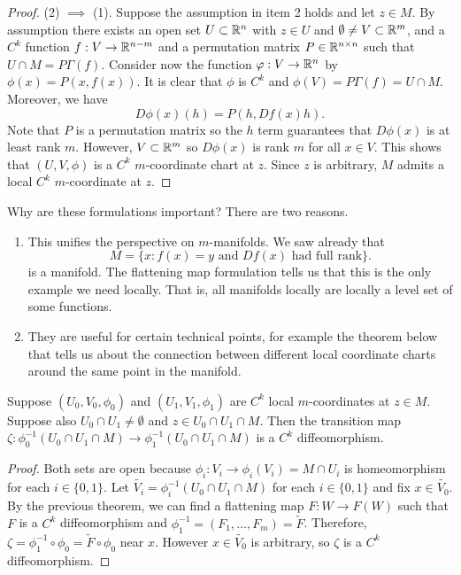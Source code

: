 \documentclass[a4paper]{article}
\begin{document}
\begin{proof}
  (2) $\implies$ (1). Suppose the assumption in item 2 holds
  and let $z \in M$. By assumption there exists an
  open set $U \subset \mathbb{R}^n$ with $z \in U$ and $\emptyset
    \neq V \subset \mathbb{R}^m$, and a $C^k$ function $f : V \to \mathbb{R}^{n - m}$
  and a permutation matrix $P \in \mathbb{R}^{n \times n}$ such that
  $U \cap M = P \Gamma (f)$. Consider now the function
  $\varphi: V \to \mathbb{R}^n$ by $\phi(x) = P (x, f(x))$. It is
  clear that $\phi$ is $C^k$ and $\phi(V) = P \Gamma(f)
    = U \cap M$. Moreover, we have
  \[
    D \phi(x) (h) = P (h, Df(x) h).
  \]
  Note that $P$ is a permutation matrix so the $h$ term guarantees that $D
  \phi(x)$ is at least rank $m$. However, $V \subset \mathbb{R}^m$ so $D \phi(x)$
  is rank $m$ for all $x \in V$. This shows that $(U, V, \phi)$ is a $C^k$
  $m$-coordinate chart at $z$. Since $z$ is arbitrary, $M$ admits a local
  $C^k$ $m$-coordinate at $z$.
\end{proof}

Why are these formulations important? There are two reasons.
\begin{enumerate}
  \item This unifies the perspective on $m$-manifolds. We saw already that
        \[
          M = \{x : \text{$f(x) = y$ and $Df(x)$ had full rank}\}.
        \]
        is a manifold. The flattening map formulation tells us that this
        is the only example we need locally. That is, all manifolds
        locally are locally a level set of some functions.

  \item They are useful for certain technical points, for example the
        theorem below that tells us about the connection between different
        local coordinate charts around the same point in the manifold.
\end{enumerate}

\begin{thm}
  Suppose $(U_0, V_0, \phi_0)$ and $(U_1, V_1, \phi_1)$ are $C^k$ local
  $m$-coordinates at $z \in M$. Suppose also $U_0 \cap U_1 \neq \emptyset$
  and $z \in U_0 \cap U_1 \cap M$. Then the transition map $\zeta :
    \phi_0^{-1}(U_0 \cap U_1 \cap M) \to \phi_1^{-1} (U_0 \cap U_1 \cap M)$
  is a $C^k$ diffeomorphism.
\end{thm}

\begin{proof}
  Both sets are open because $\phi_i : V_i \to \phi_i(V_i) = M \cap U_i$
  is homeomorphism for each $i \in \{0, 1\}$. Let $\tilde{V_i} =
    \phi_i^{-1} (U_0 \cap U_1 \cap M)$ for each $i \in \{0, 1\}$ and fix $x
    \in \tilde{V_0}$. By the previous theorem, we can find a flattening map
  $F : W \to F(W)$ such that $F$ is a $C^k$ diffeomorphism and
  $\phi_1^{-1} = (F_1, \dots, F_m) = \tilde{F}$. Therefore, $\zeta =
    \phi_1^{-1} \circ \phi_0 = \tilde{F} \circ \phi_0$ near $x$. However $x
    \in \tilde{V_0}$ is arbitrary, so $\zeta$ is a $C^k$ diffeomorphism.
\end{proof}
\end{document}
